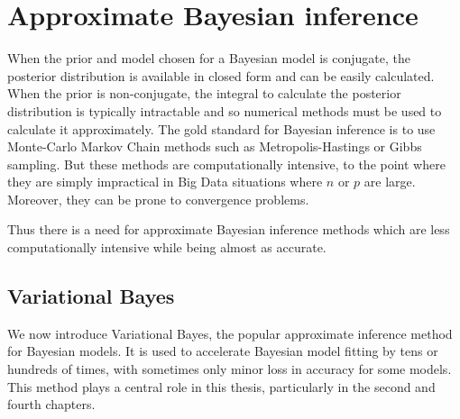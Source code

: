 

\section{Approximate Bayesian inference}

When the prior and model chosen for a Bayesian model is conjugate, the posterior
distribution is available in closed form and can be easily calculated.  When the
prior is non-conjugate, the integral to calculate the posterior distribution is
typically intractable and so numerical methods must be used to calculate it
approximately.  The gold standard for Bayesian inference is to use Monte-Carlo
Markov Chain methods such as Metropolis-Hastings or Gibbs sampling. But these
methods are computationally intensive, to the point where they are simply
impractical in Big Data situations where $n$ or $p$ are large. Moreover, they
can be prone to convergence problems.

Thus there is a need for approximate Bayesian inference methods which are less
computationally intensive while being almost as accurate.

 
\subsection{Variational Bayes}
\label{sec:vb}

We now introduce Variational Bayes, the popular approximate inference method for
Bayesian models. It is used to accelerate Bayesian model fitting by tens or
hundreds of times, with sometimes only minor loss in accuracy for some models.
This method plays a central role in this thesis, particularly in the second and
fourth chapters.


